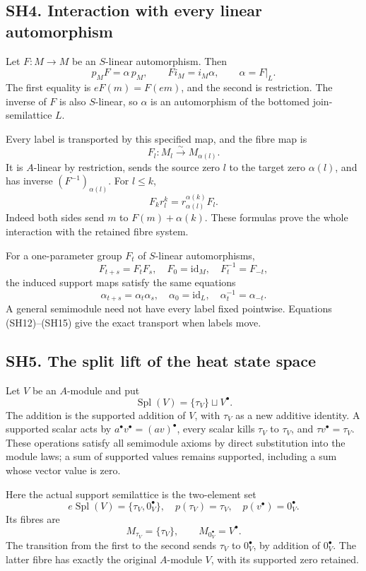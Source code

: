 \documentclass[
]{article}
\begin{document}
\subsection{SH4. Interaction with every linear
automorphism}\label{sh4.-interaction-with-every-linear-automorphism}

Let \(F:M\to M\) be an \(S\)-linear automorphism. Then \[
p_MF=\alpha\,p_M,\qquad Fi_M=i_M\alpha,
\qquad\alpha=F|_L.
\tag{SH12}
\] The first equality is \(eF(m)=F(em)\), and the second is restriction.
The inverse of \(F\) is also \(S\)-linear, so \(\alpha\) is an
automorphism of the bottomed join-semilattice \(L\).

Every label is transported by this specified map, and the fibre map is
\[
F_l:M_l\xrightarrow{\sim}M_{\alpha(l)}.
\tag{SH13}
\] It is \(A\)-linear by restriction, sends the source zero \(l\) to the
target zero \(\alpha(l)\), and has inverse \((F^{-1})_{\alpha(l)}\). For
\(l\le k\), \[
F_k r_l^k=r_{\alpha(l)}^{\alpha(k)}F_l.
\tag{SH14}
\] Indeed both sides send \(m\) to \(F(m)+\alpha(k)\). These formulas
prove the whole interaction with the retained fibre system.

For a one-parameter group \(F_t\) of \(S\)-linear automorphisms, \[
F_{t+s}=F_tF_s,\quad F_0=\mathrm{id}_M,\quad F_t^{-1}=F_{-t},
\] the induced support maps satisfy the same equations \[
\alpha_{t+s}=\alpha_t\alpha_s,\quad\alpha_0=\mathrm{id}_L,
\quad\alpha_t^{-1}=\alpha_{-t}.
\tag{SH15}
\] A general semimodule need not have every label fixed pointwise.
Equations (SH12)--(SH15) give the exact transport when labels move.

\subsection{SH5. The split lift of the heat state
space}\label{sh5.-the-split-lift-of-the-heat-state-space}

Let \(V\) be an \(A\)-module and put \[
\operatorname{Spl}(V)=\{\tau_V\}\sqcup V^\bullet.
\tag{SH16}
\] The addition is the supported addition of \(V\), with \(\tau_V\) as a
new additive identity. A supported scalar acts by
\(a^\bullet v^\bullet=(av)^\bullet\), every scalar kills \(\tau_V\) to
\(\tau_V\), and \(\tau v^\bullet=\tau_V\). These operations satisfy all
semimodule axioms by direct substitution into the module laws; a sum of
supported values remains supported, including a sum whose vector value
is zero.

Here the actual support semilattice is the two-element set \[
e\operatorname{Spl}(V)=\{\tau_V,0_V^\bullet\},
\quad
p(\tau_V)=\tau_V,\quad p(v^\bullet)=0_V^\bullet.
\tag{SH17}
\] Its fibres are \[
M_{\tau_V}=\{\tau_V\},\qquad
M_{0_V^\bullet}=V^\bullet.
\tag{SH18}
\] The transition from the first to the second sends \(\tau_V\) to
\(0_V^\bullet\), by addition of \(0_V^\bullet\). The latter fibre has
exactly the original \(A\)-module \(V\), with its supported zero
retained.
\end{document}
